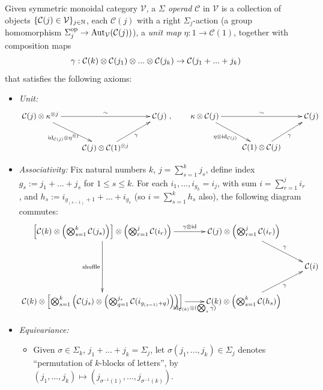 \documentclass{article}
\begin{document}
\hfil

\begin{defn}
Given symmetric monoidal category $\mathcal{V}$, a \emph{$\Sigma$ operad} $\mathcal{C}$ in $\mathcal{V}$ is a collection of objects $\{\mathcal{C}(j)\in\mathcal{V}\}_{j\in\mathbb{N}}$, each $\mathcal{C}(j)$ with a right $\Sigma_j$-action (a group homomorphism $\Sigma_j^{\mathrm{op}}\rightarrow \mathrm{Aut}_\mathcal{V}(\mathcal{C}(j))$), a \emph{unit map} $\eta:1\rightarrow \mathcal{C}(1)$, together with composition maps
\[\gamma:\mathcal{C}(k)\otimes \mathcal{C}(j_1)\otimes...\otimes \mathcal{C}(j_k)\rightarrow \mathcal{C}(j_1+...+j_k)\]
that satisfies the following axioms:
\begin{itemize}
    \item \emph{Unit:}
    \[\xymatrix{
        \mathcal{C}(j)\tensor \kappa^{\tensor j} \ar[dr]_-{\id_{\mathcal{C}(j)}\tensor \eta^{\tensor j}} \ar[rr]^-{\sim} && \mathcal{C}(j)\\
        & \mathcal{C}(j)\tensor \mathcal{C}(1)^{\tensor j} \ar[ur]_-{\gamma}
    },\quad\quad \xymatrix{
        \kappa\tensor \mathcal{C}(j) \ar[dr]_-{\eta\tensor \id_{\mathcal{C}(j)}} \ar[rr]^-{\sim} && \mathcal{C}(j)\\
        & \mathcal{C}(1)\tensor \mathcal{C}(j) \ar[ur]_-{\gamma}
    }\]
    \item \emph{Associativity:} Fix natural numbers $k$, $j = \sum_{s=1}^k j_s$, define index $g_s:= j_1+...+j_s$ for $1\leq s\leq k$. For each $i_1,...,i_{g_k}=i_j$, with sum $i=\sum_{r=1}^j i_r$, and $h_s:= i_{g_{(s-1)}+1}+...+i_{g_s}$ (so $i=\sum_{s=1}^k h_s$ also), the following diagram commutes:
    \[\xymatrix{
        \left[\mathcal{C}(k)\tensor \left(\bigtensor_{s=1}^k \mathcal{C}(j_s)\right)\right]\tensor \left(\bigtensor_{r=1}^j \mathcal{C}(i_r)\right) \ar[dd]_-{\text{shuffle}} \ar[r]^-{\gamma\tensor \id} & \mathcal{C}(j) \tensor \left(\bigtensor_{r=1}^j \mathcal{C}(i_r)\right) \ar[dr]^-{\gamma}\\
        && \mathcal{C}(i)\\
        \mathcal{C}(k) \tensor \left[\bigtensor_{s=1}^k \left(\mathcal{C}(j_s)\tensor \left(\bigtensor_{q=1}^{j_s} \mathcal{C}(i_{g_{(s-1)}+q})\right)\right)\right] \ar[r]_-{\id_{\mathcal{C}(k)} \tensor (\bigtensor_s \gamma)} & \mathcal{C}(k)\tensor \left(\bigtensor_{s=1}^k \mathcal{C}(h_s)\right) \ar[ur]_-{\gamma}
    }\]
    \item \emph{Equivariance:}
    \begin{itemize}
        \item Given $\sigma\in\Sigma_k$, $j_1+...+j_k = \Sigma_j$, let $\sigma(j_1,...,j_k)\in\Sigma_j$ denotes ``permutation of $k$-blocks of letters'', by $(j_1,...,j_k)\mapsto (j_{\sigma^{-1}(1)},...,j_{\sigma^{-1}(k)})$.

\end{itemize}
\end{itemize}
\end{defn}
\end{document}
